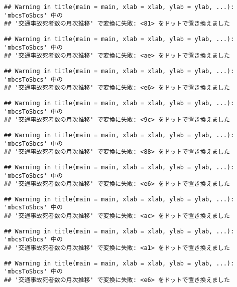 \documentclass[]{article}
\begin{document}
\begin{verbatim}
## Warning in title(main = main, xlab = xlab, ylab = ylab, ...): 'mbcsToSbcs' 中の
## '交通事故死者数の月次推移' で変換に失敗: <81> をドットで置き換えました
\end{verbatim}

\begin{verbatim}
## Warning in title(main = main, xlab = xlab, ylab = ylab, ...): 'mbcsToSbcs' 中の
## '交通事故死者数の月次推移' で変換に失敗: <ae> をドットで置き換えました
\end{verbatim}

\begin{verbatim}
## Warning in title(main = main, xlab = xlab, ylab = ylab, ...): 'mbcsToSbcs' 中の
## '交通事故死者数の月次推移' で変換に失敗: <e6> をドットで置き換えました
\end{verbatim}

\begin{verbatim}
## Warning in title(main = main, xlab = xlab, ylab = ylab, ...): 'mbcsToSbcs' 中の
## '交通事故死者数の月次推移' で変換に失敗: <9c> をドットで置き換えました
\end{verbatim}

\begin{verbatim}
## Warning in title(main = main, xlab = xlab, ylab = ylab, ...): 'mbcsToSbcs' 中の
## '交通事故死者数の月次推移' で変換に失敗: <88> をドットで置き換えました
\end{verbatim}

\begin{verbatim}
## Warning in title(main = main, xlab = xlab, ylab = ylab, ...): 'mbcsToSbcs' 中の
## '交通事故死者数の月次推移' で変換に失敗: <e6> をドットで置き換えました
\end{verbatim}

\begin{verbatim}
## Warning in title(main = main, xlab = xlab, ylab = ylab, ...): 'mbcsToSbcs' 中の
## '交通事故死者数の月次推移' で変換に失敗: <ac> をドットで置き換えました
\end{verbatim}

\begin{verbatim}
## Warning in title(main = main, xlab = xlab, ylab = ylab, ...): 'mbcsToSbcs' 中の
## '交通事故死者数の月次推移' で変換に失敗: <a1> をドットで置き換えました
\end{verbatim}

\begin{verbatim}
## Warning in title(main = main, xlab = xlab, ylab = ylab, ...): 'mbcsToSbcs' 中の
## '交通事故死者数の月次推移' で変換に失敗: <e6> をドットで置き換えました
\end{verbatim}
\end{document}
